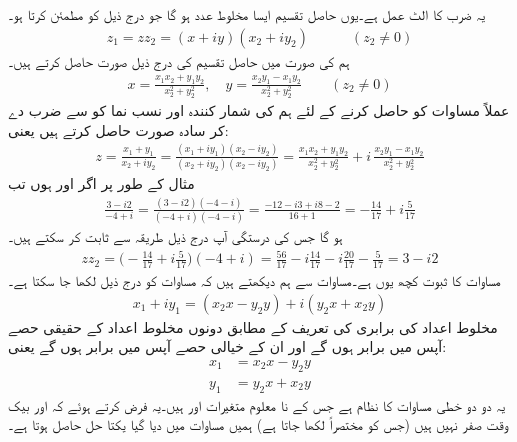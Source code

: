  یہ ضرب کا الٹ عمل ہے۔یوں حاصل تقسیم  ایسا مخلوط عدد  ہو گا جو درج ذیل کو مطمئن کرتا ہو۔
\begin{align}\label{مساوات_مخلوط_عمل_تقسیم}
z_1=zz_2=(x+iy)(x_2+iy_2)\quad \quad \quad (z_2\ne 0)
\end{align} 
ہم  کی صورت میں حاصل تقسیم  کی درج ذیل صورت حاصل کرتے ہیں۔
\begin{align}\label{مساوات_مخلوط_عمل_تقسیم_کلیات_الف}
x=\frac{x_1x_2+y_1y_2}{x_2^2+y_2^2},\quad y=\frac{x_2y_1-x_1y_2}{x_2^2+y_2^2}\quad \quad (z_2\ne 0)
\end{align}
عملاً مساوات  کو حاصل کرنے کے لئے  ہم  کی شمار کنندہ اور نسب نما کو  سے ضرب دے کر سادہ صورت حاصل کرتے ہیں یعنی:
\begin{align}\label{مساوات_مخلوط_عمل_تقسیم_کلیات_ب}
z=\frac{x_1+y_1}{x_2+iy_2}=\frac{(x_1+iy_1)(x_2-iy_2)}{(x_2+iy_2)(x_2-iy_2)}=\frac{x_1x_2+y_1y_2}{x_2^2+y_2^2}+i\,\frac{x_2y_1-x_1y_2}{x_2^2+y_2^2}
\end{align}
مثال کے طور پر اگر  اور  ہوں تب
\begin{align*}
\frac{3-i2}{-4+i}=\frac{(3-i2)(-4-i)}{(-4+i)(-4-i)}=\frac{-12-i3+i8-2}{16+1}=-\frac{14}{17}+i\frac{5}{17}
\end{align*}
ہو گا جس کی درستگی آپ درج ذیل طریقہ سے ثابت کر سکتے ہیں۔
\begin{align*}
zz_2=\big(-\frac{14}{17}+i\frac{5}{17}\big)(-4+i)=\frac{56}{17}-i\frac{14}{17}-i\frac{20}{17}-\frac{5}{17}=3-i2
\end{align*} 
مساوات  کا ثبوت کچھ یوں ہے۔مساوات  سے ہم دیکھتے ہیں کہ مساوات  کو درج ذیل لکھا جا سکتا ہے۔
\begin{align*}
x_1+iy_1=(x_2x-y_2y)+i(y_2x+x_2y)
\end{align*}
مخلوط اعداد کی برابری کی تعریف کے مطابق دونوں مخلوط اعداد کے حقیقی حصے آپس میں برابر ہوں گے اور ان کے خیالی حصے آپس میں برابر ہوں گے یعنی:
\begin{align*}
x_1&=x_2x-y_2y\\
y_1&=y_2x+x_2y
\end{align*}
یہ دو دو خطی مساوات کا نظام ہے جس کے نا معلوم متغیرات  اور  ہیں۔یہ فرض کرتے ہوئے کہ  اور  بیک وقت صفر نہیں ہیں (جس کو مختصراً  لکھا جاتا ہے) ہمیں مساوات  میں دیا گیا یکتا حل حاصل ہوتا ہے۔

